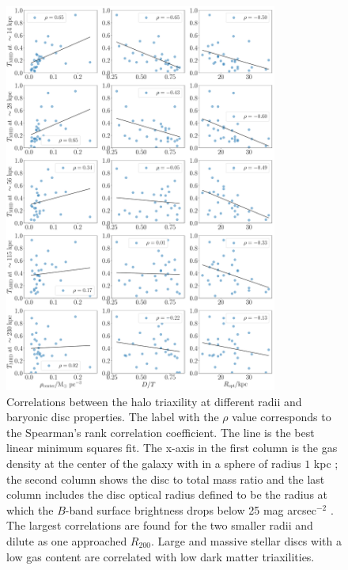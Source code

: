 \documentclass[usenatbib]{mnras}
\begin{document}
\begin{figure}
\begin{center}
\includegraphics[width=0.8\textwidth]{correlation_T_MHD_disc.pdf}
\end{center}
\caption{Correlations between the halo triaxility at different radii
  and baryonic disc properties. 
  The label with the $\rho$ value corresponds to the Spearman's rank
  correlation coefficient.
  The line is the best linear minimum squares fit.
  The x-axis in the first column is the gas density at the center of
  the galaxy with in a sphere of radius  $1$ kpc \citep{Pakmor17};
  the second column shows the disc to total mass ratio and the last
  column includes the disc optical radius defined to be the radius at which the
  $B$-band surface brightness drops below 25 mag arcsec$^{-2}$ \citep{auriga}.
  The largest correlations are found for the two smaller radii and
  dilute as one approached $R_{200}$.
  Large and massive stellar discs with a low gas content are
  correlated with low dark matter triaxilities.}
\label{fig:disc_correlations}
\end{figure}
\end{document}
